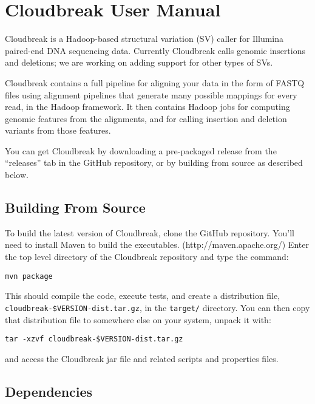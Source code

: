 \documentclass[11pt]{article}
\begin{document}
\printbibliography[title={Supplementary References}]

\newpage

\section{Cloudbreak User Manual}
\label{cloudbreak}

Cloudbreak is a Hadoop-based structural variation (SV) caller for Illumina
paired-end DNA sequencing data. Currently Cloudbreak calls genomic insertions
and deletions; we are working on adding support for other types of SVs.

Cloudbreak contains a full pipeline for aligning your data in the form of FASTQ
files using alignment pipelines that generate many possible mappings for every
read, in the Hadoop framework. It then contains Hadoop jobs for computing
genomic features from the alignments, and for calling insertion and deletion
variants from those features.

You can get Cloudbreak by downloading a pre-packaged release from the ``releases''
tab in the GitHub repository, or by building from source as described below.

\subsection{Building From Source}
\label{buildingfromsource}

To build the latest version of Cloudbreak, clone the GitHub repository. You'll
need to install Maven to build the executables. (http:/\slash maven.apache.org\slash )
Enter the top level directory of the Cloudbreak repository and type the command:

\texttt{mvn package}

This should compile the code, execute tests, and create a distribution file, \linebreak
 \texttt{cloudbreak-\$VERSION-dist.tar.gz}, in the \texttt{target\slash } directory. You can then copy
 that distribution file to somewhere else on your system, unpack it with:

 \texttt{tar -xzvf cloudbreak-\$VERSION-dist.tar.gz} 

and access the Cloudbreak jar file and related scripts and properties files.

\subsection{Dependencies}
\label{dependencies}
\end{document}
